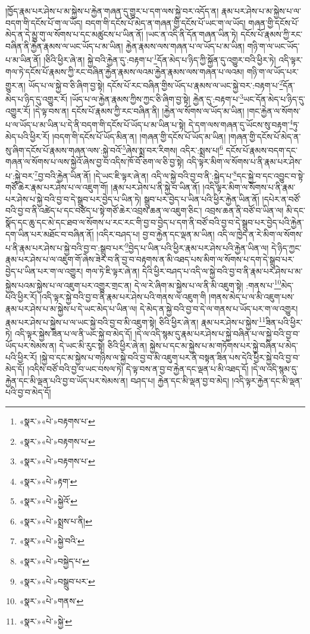 །ཁྱོད་རྣམ་པར་ཤེས་པ་མ་སྐྱེས་པ་རྐྱེན་གཞན་དུ་གྱུར་པ་དག་ལས་སྐྱེ་བར་འདོད་ན། རྣམ་པར་ཤེས་པ་མ་སྐྱེས་པ་ལ་བདག་གི་དངོས་པོ་ག་ལ་ཡོད། བདག་གི་དངོས་པོ་མེད་ན་གཞན་གྱི་དངོས་པོ་ཡང་ག་ལ་ཡོད། གཞན་གྱི་དངོས་པོ་མེད་ན་དེ་མྱུ་གུ་ལ་སོགས་པ་དང་མཚུངས་པ་ཡིན་ནོ། །ཡང་ན་འདི་ནི་དོན་གཞན་ཡིན་ཏེ། དངོས་པོ་རྣམས་ཀྱི་རང་བཞིན་ནི་རྐྱེན་རྣམས་ལ་ཡང་ཡོད་པ་མ་ཡིན། རྐྱེན་རྣམས་ལས་གཞན་པ་ལ་ཡོད་པ་མ་ཡིན། གཉི་ག་ལ་ཡང་ཡོད་པ་མ་ཡིན་ནོ། །ཅིའི་ཕྱིར་ཞེ་ན། སྐྱེ་བའི་རྐྱེན་དུ་:བརྟག་པ་\footnote{«སྣར་»«པེ་»བརྟགས་པ་}དོན་མེད་པ་ཉིད་ཀྱི་སྐྱོན་དུ་འགྱུར་བའི་ཕྱིར་ཏེ། འདི་ལྟར་གལ་ཏེ་དངོས་པོ་རྣམས་ཀྱི་རང་བཞིན་རྐྱེན་རྣམས་ལའམ་རྐྱེན་རྣམས་ལས་གཞན་པ་ལའམ། གཉི་ག་ལ་ཡོད་པར་གྱུར་ན། ཡོད་པ་ལ་སྐྱེ་བ་ཅི་ཞིག་བྱ་སྟེ། དངོས་པོ་རང་བཞིན་གྱིས་ཡོད་པ་རྣམས་ལ་ཡང་སྐྱེ་བར་:བརྟག་པ་\footnote{«སྣར་»«པེ་»བརྟགས་པ་}དོན་མེད་པ་ཉིད་དུ་འགྱུར་རོ། །ཡོད་པ་ལ་རྐྱེན་རྣམས་ཀྱིས་ཀྱང་ཅི་ཞིག་བྱ་སྟེ། རྐྱེན་དུ་:བརྟག་པ་\footnote{«སྣར་»«པེ་»བརྟགས་པ་}ཡང་དོན་མེད་པ་ཉིད་དུ་འགྱུར་རོ། །དེ་ལྟ་བས་ན། དངོས་པོ་རྣམས་ཀྱི་རང་བཞིན་ནི། །རྐྱེན་ལ་སོགས་ལ་ཡོད་མ་ཡིན། །གང་རྐྱེན་ལ་སོགས་པ་ལ་ཡོད་པ་མ་ཡིན་པ་དེ་ནི་བདག་གི་དངོས་པོ་ཡོད་པ་མ་ཡིན་པ་སྟེ། དེ་དག་ལས་གཞན་དུ་ཡོངས་སུ་བརྟག་\footnote{«སྣར་»«པེ་»རྟག་}ཏུ་མེད་པའི་ཕྱིར་རོ། །བདག་གི་དངོས་པོ་ཡོད་མིན་ན། །གཞན་གྱི་དངོས་པོ་ཡོད་མ་ཡིན། །གཞན་གྱི་དངོས་པོ་མེད་ན་སུ་ཞིག་དངོས་པོ་རྣམས་གཞན་ལས་:སྐྱེ་བའོ་\footnote{«སྣར་»«པེ་»སྐྱེའོ་}ཞེས་སྨྲ་བར་རིགས། འདིར་:སྨྲས་པ།\footnote{«སྣར་»«པེ་»སྨྲས་པ་ནི།} དངོས་པོ་རྣམས་བདག་དང་གཞན་ལ་སོགས་པ་ལས་སྐྱེའོ་ཞེས་བྱ་བ་འདིས་ཁོ་བོ་ཅག་ལ་ཅི་བྱ་སྟེ། འདི་ལྟར་མིག་ལ་སོགས་པ་ནི་རྣམ་པར་ཤེས་པ་:སྐྱེ་བར་\footnote{«སྣར་»«པེ་»སྐྱེ་བའི་}བྱ་བའི་རྐྱེན་ཡིན་ནོ། །དེ་ཡང་ཇི་ལྟར་ཞེ་ན། འདི་ལ་སྐྱེ་བའི་བྱ་བ་ནི་:སྐྱེད་པ་\footnote{«སྣར་»«པེ་»བསྐྱེད་པ་}དང་སྐྱེ་བ་དང་འབྱུང་བ་སྟེ་གཙོ་ཆེར་རྣམ་པར་ཤེས་པ་ལ་འཇུག་གོ། །རྣམ་པར་ཤེས་པ་ནི་སྐྱེ་བ་ཡིན་ནོ། །འདི་ལྟར་མིག་ལ་སོགས་པ་ནི་རྣམ་པར་ཤེས་པ་སྐྱེ་བའི་བྱ་བ་དེ་སྒྲུབ་པར་བྱེད་པ་ཡིན་ཏེ། སྒྲུབ་པར་བྱེད་པ་ཡིན་པའི་ཕྱིར་རྐྱེན་ཡིན་ནོ། །དཔེར་ན་བཙོ་བའི་བྱ་བ་ནི་འཚེད་པ་དང་བཙེད་པ་སྟེ་གཙོ་ཆེར་འབྲས་ཆན་ལ་འཇུག་ཅིང་། འབྲས་ཆན་ནི་བཙོ་བ་ཡིན་ལ། མི་དང་སྣོད་དང་ཆུ་དང་མེ་དང་ཐབ་ལ་སོགས་པ་རང་རང་གི་བྱ་བ་བྱེད་པ་དག་ནི་བཙོ་བའི་བྱ་བ་དེ་སྒྲུབ་པར་བྱེད་པའི་རྐྱེན་དག་ཡིན་པར་མཐོང་བ་བཞིན་ནོ། །འདིར་བཤད་པ། བྱ་བ་རྐྱེན་དང་ལྡན་མ་ཡིན། འདི་ལ་ཁྱེད་ན་རེ་མིག་ལ་སོགས་པ་ནི་རྣམ་པར་ཤེས་པ་སྐྱེ་བའི་བྱ་བ་:སྒྲུབ་པར་\footnote{«སྣར་»«པེ་»བསྒྲུབ་པར་}བྱེད་པ་ཡིན་པའི་ཕྱིར་རྣམ་པར་ཤེས་པའི་རྐྱེན་ཡིན་ལ། དེ་ཉིད་ཀྱང་རྣམ་པར་ཤེས་པ་ལ་འཇུག་གོ་ཞེས་ཟེར་བ་ནི་བྱ་བ་བརྟགས་ན་མི་འཐད་པས་མིག་ལ་སོགས་པ་དག་དེ་སྒྲུབ་པར་བྱེད་པ་ཡིན་པར་ག་ལ་འགྱུར། གལ་ཏེ་ཇི་ལྟར་ཞེ་ན། དེའི་ཕྱིར་བཤད་པ་འདི་ལ་སྐྱེ་བའི་བྱ་བ་ནི་རྣམ་པར་ཤེས་པ་མ་སྐྱེས་པའམ་སྐྱེས་པ་ལ་འཇུག་པར་འགྱུར་གྲང་ན། དེ་ལ་རེ་ཞིག་མ་སྐྱེས་པ་ལ་ནི་མི་འཇུག་སྟེ། :གནས་པ་\footnote{«སྣར་»«པེ་»གནས་}མེད་པའི་ཕྱིར་རོ། །འདི་ལྟར་སྐྱེ་བའི་བྱ་བ་ནི་རྣམ་པར་ཤེས་པའི་གནས་ལ་འཇུག་གི །གནས་མེད་པ་ལ་མི་འཇུག་པས་རྣམ་པར་ཤེས་པ་མ་སྐྱེས་པ་དེ་ཡང་མེད་པ་ཡིན་ལ། དེ་མེད་ན་སྐྱེ་བའི་བྱ་བ་དེ་ལ་གནས་པ་ཡོད་པར་ག་ལ་འགྱུར། རྣམ་པར་ཤེས་པ་སྐྱེས་པ་ལ་ཡང་སྐྱེ་བའི་བྱ་བ་མི་འཇུག་སྟེ། ཅིའི་ཕྱིར་ཞེ་ན། རྣམ་པར་ཤེས་པ་སྐྱེས་\footnote{«སྣར་»«པེ་»སྐྱེ་}ཟིན་པའི་ཕྱིར་ཏེ། འདི་ལྟར་སྐྱེས་ཟིན་པ་ལ་ནི་ཡང་སྐྱེ་བ་མེད་དོ། །དེ་ལ་འདི་སྙམ་དུ་རྣམ་པར་ཤེས་པ་སྐྱེ་བཞིན་པ་ལ་སྐྱེ་བའི་བྱ་བ་ཡོད་པར་སེམས་ན། དེ་ཡང་མི་རུང་སྟེ། ཅིའི་ཕྱིར་ཞེ་ན། སྐྱེས་པ་དང་མ་སྐྱེས་པ་མ་གཏོགས་པར་སྐྱེ་བཞིན་པ་མེད་པའི་ཕྱིར་རོ། །སྐྱེ་བ་དང་མ་སྐྱེས་པ་གཉིས་ལ་སྐྱེ་བའི་བྱ་བ་མི་འཇུག་པར་ནི་བསྟན་ཟིན་པས་དེའི་ཕྱིར་སྐྱེ་བའི་བྱ་བ་མེད་དོ། །འདིས་བཙོ་བའི་བྱ་བ་ཡང་བསལ་ཏེ། དེ་ལྟ་བས་ན་བྱ་བ་རྐྱེན་དང་ལྡན་པ་མི་འཐད་དོ། །དེ་ལ་འདི་སྙམ་དུ་རྐྱེན་དང་མི་ལྡན་པའི་བྱ་བ་ཡོད་པར་སེམས་ན། བཤད་པ། རྐྱེན་དང་མི་ལྡན་བྱ་བ་མེད། །འདི་ལྟར་རྐྱེན་དང་མི་ལྡན་པའི་བྱ་བ་མེད་དོ། 